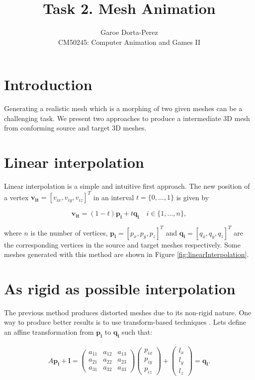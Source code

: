 \documentclass[12pt]{article}
\begin{document}
  
\title{Task 2. Mesh Animation}
\author{Garoe Dorta-Perez\\
CM50245: Computer Animation and Games II}
 
\maketitle
 
\section{Introduction}

Generating a realistic mesh which is a morphing of two given meshes can be a challenging task.
We present two approaches to produce a intermediate 3D mesh from conforming source and target 3D meshes. 

\section{Linear interpolation}

Linear interpolation is a simple and intuitive first approach.
The new position of a vertex $\mathbf{v_{it}} = \left[ v_{ix}, v_{iy}, v_{iz}\right]^T $ in an interval $t = \lbrace 0, \ldots, 1 \rbrace$ is given by

\begin{equation*}
\mathbf{v_{it}} = (1 - t) \mathbf{p_i} + t \mathbf{q_i} \quad i \in \lbrace 1, \ldots, n \rbrace,
\end{equation*}

where $n$ is the number of vertices, $\mathbf{p_i} = \left[ p_x, p_y, p_z\right]^T$ and $\mathbf{q_i} = \left[ q_x, q_y, q_z\right]^T$ are the corresponding vertices in the source and target meshes respectively.
Some meshes generated with this method are shown in Figure \ref{fig:linearInterpolation}.

\section{As rigid as possible interpolation}

The previous method produces distorted meshes due to its non-rigid nature.
One way to produce better results is to use transform-based techniques \cite{Alexa2000}.
Lets define an affine transformation from $\mathbf{p_i}$ to $\mathbf{q_i}$ such that:

\begin{align*}
A \mathbf{p_i} + \mathbf{l} = \begin{pmatrix}
 a_{11} & a_{12} & a_{13} \\ 
 a_{21} & a_{22} & a_{23} \\ 
 a_{31} & a_{32}  & a_{33} 
\end{pmatrix} 
\begin{pmatrix}
 p_{ix} \\ 
 p_{iy} \\ 
 p_{iz} 
\end{pmatrix} +
\begin{pmatrix}
 l_x \\ 
 l_y \\ 
 l_z
\end{pmatrix} = \mathbf{q_i}.
\end{align*}
\end{document}
